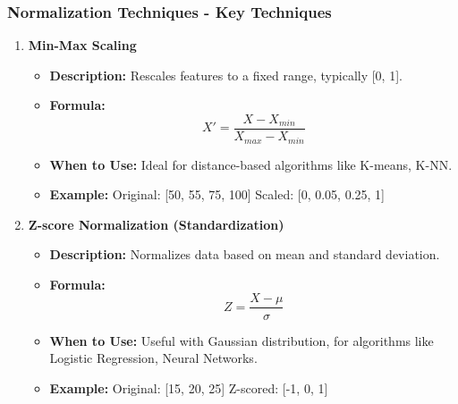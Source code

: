 \documentclass[aspectratio=169]{beamer}
\begin{document}
\begin{frame}[fragile]
    \frametitle{Normalization Techniques - Key Techniques}
    \begin{enumerate}
        \item \textbf{Min-Max Scaling}
        \begin{itemize}
            \item \textbf{Description:} Rescales features to a fixed range, typically [0, 1].
            \item \textbf{Formula:} 
            \begin{equation}
            X' = \frac{X - X_{min}}{X_{max} - X_{min}}
            \end{equation}
            \item \textbf{When to Use:} Ideal for distance-based algorithms like K-means, K-NN.
            \item \textbf{Example:} 
                Original: [50, 55, 75, 100]
                Scaled: [0, 0.05, 0.25, 1]
        \end{itemize}

        \item \textbf{Z-score Normalization (Standardization)}
        \begin{itemize}
            \item \textbf{Description:} Normalizes data based on mean and standard deviation.
            \item \textbf{Formula:} 
            \begin{equation}
            Z = \frac{X - \mu}{\sigma}
            \end{equation}
            \item \textbf{When to Use:} Useful with Gaussian distribution, for algorithms like Logistic Regression, Neural Networks.
            \item \textbf{Example:} 
                Original: [15, 20, 25]
                Z-scored: [-1, 0, 1]
        \end{itemize}
    \end{enumerate}
\end{frame}
\end{document}
